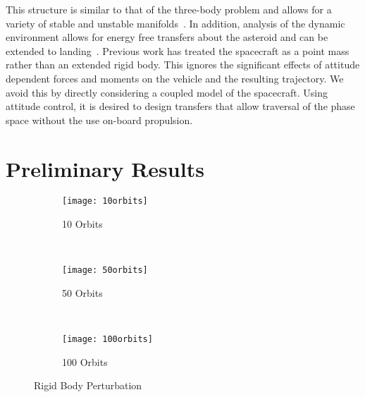 \documentclass[11pt,draft]{article} %
\begin{document}
This structure is similar to that of the three-body problem and allows for a variety of stable and unstable manifolds~\cite{hu2002}.
In addition, analysis of the dynamic environment allows for energy free transfers about the asteroid and can be extended to landing~\cite{herrera2014}.
Previous work has treated the spacecraft as a point mass rather than an extended rigid body.
This ignores the significant effects of attitude dependent forces and moments on the vehicle and the resulting trajectory. 
We avoid this by directly considering a coupled model of the spacecraft.
Using attitude control, it is desired to design transfers that allow traversal of the phase space without the use on-board propulsion.

%
%

\section{Preliminary Results}
\begin{figure}
	\centering 
	\begin{subfigure}[htbp]{0.3\textwidth} 
		\texttt{[image: 10orbits]} 
		\caption{\num{10} Orbits} \label{fig:10orbits} 
	\end{subfigure}~ %
	\begin{subfigure}[htbp]{0.3\textwidth} 
		\texttt{[image: 50orbits]} 
		\caption{\num{50} Orbits} \label{fig:50orbits} 
	\end{subfigure} ~ %
	\begin{subfigure}[htbp]{0.3\textwidth} 
		\texttt{[image: 100orbits]} 
		\caption{\num{100} Orbits} \label{fig:100orbits} 
	\end{subfigure} 
	\caption{Rigid Body Perturbation}
	\label{fig:orbits} 
\end{figure}
\end{document}
